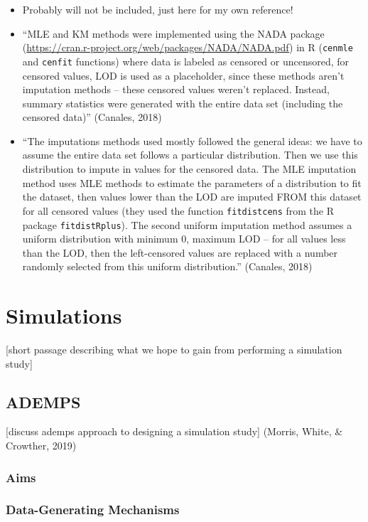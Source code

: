 \documentclass[12pt, twoside]{amherstthesis}
\begin{document}
\begin{itemize}
\item
  Probably will not be included, just here for my own reference!
\item
  ``MLE and KM methods were implemented using the NADA package (\url{https://cran.r-project.org/web/packages/NADA/NADA.pdf}) in R (\texttt{cenmle} and \texttt{cenfit} functions) where data is labeled as censored or uncensored, for censored values, LOD is used as a placeholder, since these methods aren't imputation methods -- these censored values weren't replaced. Instead, summary statistics were generated with the entire data set (including the censored data)'' (Canales, 2018)
\item
  ``The imputations methods used mostly followed the general ideas: we have to assume the entire data set follows a particular distribution. Then we use this distribution to impute in values for the censored data. The MLE imputation method uses MLE methods to estimate the parameters of a distribution to fit the dataset, then values lower than the LOD are imputed FROM this dataset for all censored values (they used the function \texttt{fitdistcens} from the R package \texttt{fitdistRplus}). The second uniform imputation method assumes a uniform distribution with minimum 0, maximum LOD -- for all values less than the LOD, then the left-censored values are replaced with a number randomly selected from this uniform distribution.'' (Canales, 2018)
\end{itemize}
\hypertarget{simulations}{%
\chapter{Simulations}\label{simulations}}

{[}short passage describing what we hope to gain from performing a simulation study{]}

\hypertarget{ademps}{%
\section{ADEMPS}\label{ademps}}

{[}discuss ademps approach to designing a simulation study{]} (Morris, White, \& Crowther, 2019)

\hypertarget{aims}{%
\subsection{Aims}\label{aims}}

\hypertarget{data_generating_mechanisms}{%
\subsection{Data-Generating Mechanisms}\label{data_generating_mechanisms}}
\end{document}
